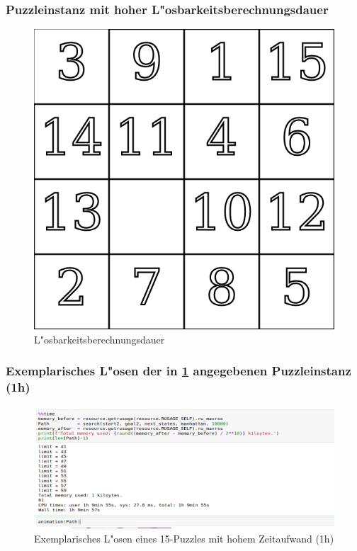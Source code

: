\subsubsection{Puzzleinstanz mit hoher L"osbarkeitsberechnungsdauer}
\begin{figure}[H]
    \centering
    \includegraphics[width=0.5\linewidth,keepaspectratio]{img/time_consuming_puzzle_instance.png}
    \captionsetup{format=plain, indention=0pt}
    \caption{L"osbarkeitsberechnungsdauer \label{app:fig:time_c_p_i}}
\end{figure}

\subsubsection{Exemplarisches L"osen der in \ref{app:fig:time_c_p_i} angegebenen Puzzleinstanz (1h)}
\begin{figure}[H]
    \centering
    \includegraphics[width=\linewidth,keepaspectratio]{img/1h_solving_time_15_puzzle.png}
    \captionsetup{format=plain, indention=0pt}
    \caption{Exemplarisches L"osen eines 15-Puzzles mit hohem Zeitaufwand (1h) \label{app:fig:1h}}
\end{figure}
